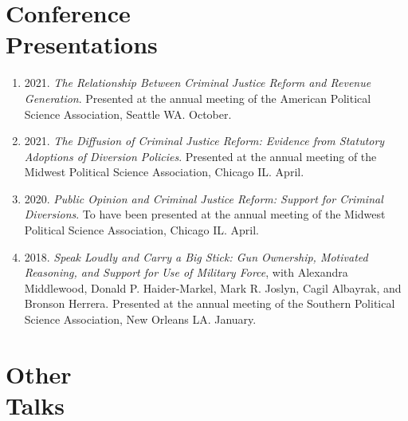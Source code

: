 \documentclass[margin,line,pifont,palatino,courier]{res}
\begin{document}
\begin{resume}




\section{\sc Conference \\ Presentations}

\begin{enumerate}

\item 2021. \emph{The Relationship Between Criminal Justice Reform and
    Revenue Generation}. Presented at the annual meeting of the
  American Political Science Association, Seattle WA. October.

\item 2021. \emph{The Diffusion of Criminal Justice Reform: Evidence
    from Statutory Adoptions of Diversion Policies}. Presented at
  the annual meeting of the Midwest Political Science Association,
  Chicago IL. April.

\item 2020. \emph{Public Opinion and Criminal Justice Reform: Support for
  Criminal Diversions}. To have been presented at the annual meeting of
the Midwest Political Science Association, Chicago IL. April.

\item 2018. \emph{Speak Loudly and Carry a Big Stick: Gun Ownership, Motivated
  Reasoning, and Support for Use of Military Force}, with Alexandra
Middlewood, Donald P. Haider-Markel, Mark R. Joslyn, Cagil Albayrak,
and Bronson Herrera. Presented at the annual meeting of the Southern
Political Science Association, New Orleans LA. January.
\end{enumerate}

\section{\sc Other\\ Talks}


\end{resume}
\end{document}
